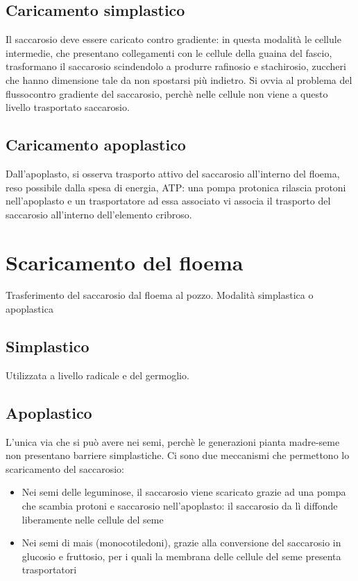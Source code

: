 \documentclass[a4paper,12pt]{book}
\begin{document}
\subsection{Caricamento simplastico}

Il saccarosio deve essere caricato contro gradiente: in questa modalità le cellule intermedie, che presentano collegamenti con le cellule della guaina del fascio, trasformano il saccarosio scindendolo a produrre rafinosio e stachirosio, zuccheri che hanno dimensione tale da non spostarsi più indietro. Si ovvia al problema del flussocontro gradiente del saccarosio, perchè nelle cellule non viene a questo livello trasportato saccarosio.

\subsection{Caricamento apoplastico}
Dall'apoplasto, si osserva trasporto attivo del saccarosio all'interno del floema, reso possibile dalla spesa di energia, ATP: una pompa protonica rilascia protoni nell'apoplasto e un trasportatore ad essa associato vi associa il trasporto del saccarosio all'interno dell'elemento cribroso.

 \section{Scaricamento del floema}
Trasferimento del saccarosio dal floema al pozzo. Modalità simplastica o apoplastica

\subsection{Simplastico}
Utilizzata a livello radicale e del germoglio.
\subsection{Apoplastico} 
 L'unica via che si può avere nei semi, perchè le generazioni pianta madre-seme non presentano barriere simplastiche. Ci sono due meccanismi che permettono lo scaricamento del saccarosio:
 \begin{itemize}
 \item{Nei semi delle leguminose, il saccarosio viene scaricato grazie ad una pompa che scambia protoni e saccarosio nell'apoplasto: il saccarosio da lì diffonde liberamente nelle cellule del seme}
 \item{Nei semi di mais (monocotiledoni), grazie alla conversione del saccarosio in glucosio e fruttosio, per i quali la membrana delle cellule del seme presenta trasportatori}
 \end{itemize}
 
\end{document}
